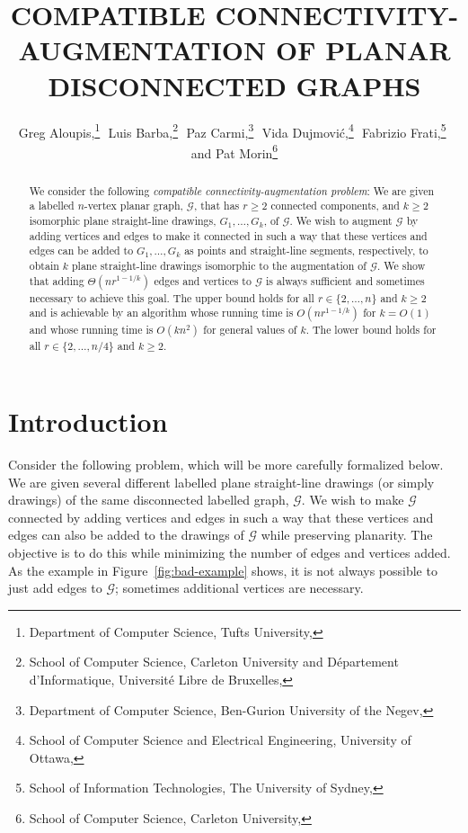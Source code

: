 \documentclass[11pt]{patmorin}
\title{\MakeUppercase{Compatible Connectivity-Augmentation \newline of Planar Disconnected Graphs}}
\author{Greg Aloupis,\thanks{Department of Computer Science, Tufts University, 
                             \email{aloupis.greg@gmail.com}}\,\,
       Luis Barba,\thanks{School of Computer Science, Carleton University
                          and Département d'Informatique, 
                          Université Libre de Bruxelles,
                          \email{lbarbafl@ulb.ac.be}}\,\,
       Paz Carmi,\thanks{Department of Computer Science,
                         Ben-Gurion University of the Negev,
                         \email{carmip@cs.bgu.ac.il}}\,\,
       Vida Dujmović,\thanks{School of Computer Science 
                             and Electrical Engineering,
                             University of Ottawa,
                             \email{vida.dujmovic@uottawa.ca}}\,\,
       Fabrizio Frati,\thanks{School of Information Technologies,
                              The University of Sydney,
                              \email{fabrizio.frati@sydney.edu.au}}\,\,
       and Pat Morin\thanks{School of Computer Science, Carleton University,
                            \email{morin@scs.carleton.ca}}}
\begin{document}
\begin{titlepage}

\maketitle
\begin{abstract}
We consider the following
\emph{compatible connectivity-augmentation problem}: We are given
a labelled $n$-vertex planar graph, $\mathcal{G}$, that has $r\ge 2$
connected components, and $k\ge 2$ isomorphic plane straight-line drawings,
$G_1,\ldots,G_k$, of $\mathcal{G}$. We wish to augment $\mathcal G$
by adding  vertices and edges to make it connected in such a way that
these vertices and edges can be added to $G_1,\ldots,G_k$ as points and
straight-line segments, respectively, to obtain $k$ plane straight-line
drawings isomorphic to the augmentation of $\mathcal G$.  We show
that adding $\Theta(nr^{1-1/k})$ edges and vertices to $\mathcal{G}$
is always sufficient and sometimes necessary to achieve this goal.
The upper bound holds for all $r\in\{2,\ldots,n\}$ and $k\ge 2$ and is
achievable by an algorithm whose running time is $O(nr^{1-1/k})$ for
$k=O(1)$ and whose running time is $O(kn^2)$ for general values of $k$.
The lower bound holds for all $r\in\{2,\ldots,n/4\}$ and $k\ge 2$.
\end{abstract}

\end{titlepage}


\section{Introduction}


Consider the following problem, which will be more carefully formalized
below.  We are given several different labelled plane straight-line drawings
(or simply drawings) of the same disconnected labelled graph, $\mathcal G$.
We wish to make $\mathcal G$ connected by adding vertices and edges in
such a way that these vertices and edges can also be added to the 
drawings of $\mathcal G$ while preserving planarity.  
The objective is to do this while minimizing the number
of edges and vertices added.  As the example in Figure~\ref{fig:bad-example} shows, it is not always possible to just add edges to $\mathcal G$; sometimes additional vertices are necessary.
\end{document}
